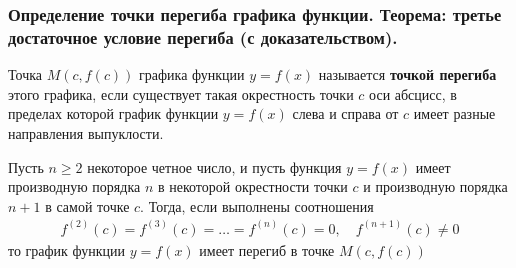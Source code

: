 \documentclass[10pt]{article}
\begin{document}
    \subsubsection{Определение точки перегиба графика функции. Теорема: третье достаточное условие перегиба (с доказательством).}
    \begin{definition}
        Точка $M(c, f(c))$ графика функции $y = f(x)$ называется \textbf{точкой перегиба} этого графика, если существует такая окрестность точки $c$ оси абсцисс, в пределах которой график функции $y = f(x)$ слева и справа от $c$ имеет разные направления выпуклости.
    \end{definition}
    \begin{theorem}
        Пусть $n \geq 2$ некоторое четное число, и пусть функция $y = f(x)$ имеет производную порядка $n$ в некоторой окрестности точки $c$ и производную порядка $n+1$ в самой точке $c$. Тогда, если выполнены соотношения
        \begin{gather}
            f^{(2)}(c)=f^{(3)}(c)=\ldots=f^{(n)}(c)=0, \quad f^{(n+1)}(c) \neq 0 \label{eq:conv_cond}
        \end{gather}
        то график функции $y = f(x)$ имеет перегиб в точке $M(c, f(c))$
    \end{theorem}
\end{document}

